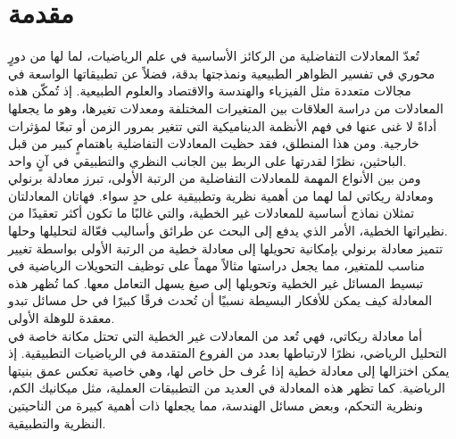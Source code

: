 \chapter*{مقدمة}
تُعدّ المعادلات التفاضلية من الركائز الأساسية في علم الرياضيات، لما لها من دورٍ محوري في تفسير الظواهر الطبيعية ونمذجتها بدقة، فضلاً عن تطبيقاتها الواسعة في مجالات متعددة مثل الفيزياء والهندسة والاقتصاد والعلوم الطبيعية. إذ تُمكّن هذه المعادلات من دراسة العلاقات بين المتغيرات المختلفة ومعدلات تغيرها، وهو ما يجعلها أداةً لا غنى عنها في فهم الأنظمة الديناميكية التي تتغير بمرور الزمن أو تبعًا لمؤثرات خارجية. ومن هذا المنطلق، فقد حظيت المعادلات التفاضلية باهتمامٍ كبير من قبل الباحثين، نظرًا لقدرتها على الربط بين الجانب النظري والتطبيقي في آنٍ واحد.\\
ومن بين الأنواع المهمة للمعادلات التفاضلية من الرتبة الأولى، تبرز معادلة برنولي ومعادلة ريكاتي لما لهما من أهمية نظرية وتطبيقية على حدٍ سواء. فهاتان المعادلتان تمثلان نماذج أساسية للمعادلات غير الخطية، والتي غالبًا ما تكون أكثر تعقيدًا من نظيراتها الخطية، الأمر الذي يدفع إلى البحث عن طرائق وأساليب فعّالة لتحليلها وحلها.\\
تتميز معادلة برنولي بإمكانية تحويلها إلى معادلة خطية من الرتبة الأولى بواسطة تغيير مناسب للمتغير، مما يجعل دراستها مثالاً مهماً على توظيف التحويلات الرياضية في تبسيط المسائل غير الخطية وتحويلها إلى صيغ يسهل التعامل معها. كما تُظهر هذه المعادلة كيف يمكن للأفكار البسيطة نسبيًا أن تُحدث فرقًا كبيرًا في حل مسائل تبدو معقدة للوهلة الأولى.\\
أما معادلة ريكاتي، فهي تُعد من المعادلات غير الخطية التي تحتل مكانة خاصة في التحليل الرياضي، نظرًا لارتباطها بعدد من الفروع المتقدمة في الرياضيات التطبيقية. إذ يمكن اختزالها إلى معادلة خطية إذا عُرف حل خاص لها، وهي خاصية تعكس عمق بنيتها الرياضية. كما تظهر هذه المعادلة في العديد من التطبيقات العملية، مثل ميكانيك الكم، ونظرية التحكم، وبعض مسائل الهندسة، مما يجعلها ذات أهمية كبيرة من الناحيتين النظرية والتطبيقية.\\
